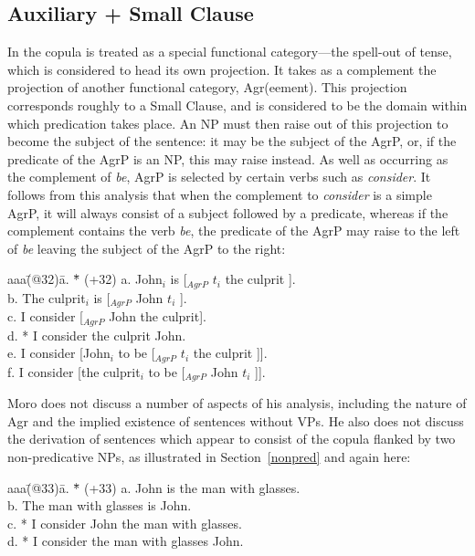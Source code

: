 \subsection{Auxiliary + Small Clause}

\label{mo}
In \cite{mor90} the copula is treated as a special functional
category---the spell-out of tense, which is considered to head its own
projection. It takes as a complement the projection of another
functional category, Agr(eement). This projection corresponds roughly to
a Small Clause, and is considered to be the domain within which
predication takes place.  An NP must then raise out of this projection
to become the subject of the sentence: it may be the subject of the
AgrP, or, if the predicate of the AgrP is an NP, this may raise instead.
As well as occurring as the complement of {\em be\/}, AgrP is
selected by certain verbs such as {\em consider\/}. It follows from this
analysis that when the complement to {\em consider} is a simple AgrP, it will
always consist of a subject followed by a predicate, whereas if the
complement contains the verb {\em be}, the predicate of the AgrP may
raise to the left of {\em be} leaving the subject of the AgrP to the
right:
\begin{tabbing}
aaa\=(@32)\= a. \= *\= \kill
   \>(+32)\> a. \>  \> John$_{i}$ is [$_{AgrP}$ $t_{i}$ the culprit ]. \\
   \>    \> b. \>  \> The culprit$_{i}$ is [$_{AgrP}$ John $t_{i}$ ]. \\
   \>    \> c. \>  \> I consider [$_{AgrP}$ John the culprit]. \\
   \>    \> d. \> *\> I consider the culprit John. \\
   \>    \> e. \>  \> I consider [John$_{i}$ to be [$_{AgrP}$ $t_{i}$ 
                      the culprit ]]. \\
   \>    \> f. \>  \> I consider [the culprit$_{i}$ to be [$_{AgrP}$ 
                      John $t_{i}$ ]].
\end{tabbing}

Moro does not discuss a number of aspects of his analysis, including the
nature of Agr and the implied existence of sentences without VPs. He
also does not discuss the derivation of sentences which appear to
consist of the copula flanked by two non-predicative NPs, as illustrated
in Section~\ref{nonpred} and again here:
\begin{tabbing}
aaa\=(@33)\= a. \= *\= \kill
   \>(+33)\> a. \>  \> John is the man with glasses. \\
   \>    \> b. \>  \> The man with glasses is John. \\
   \>    \> c. \> *\> I consider John the man with glasses.\\
   \>    \> d. \> *\> I consider the man with glasses John.
\end{tabbing}

